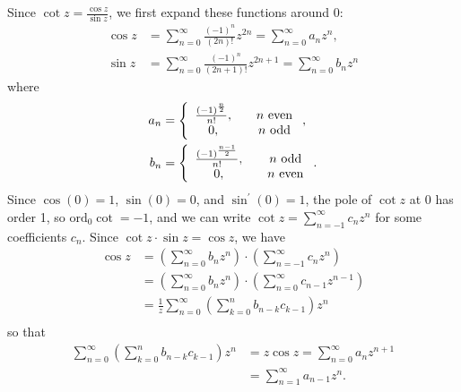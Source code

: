 \documentclass{article}
\newcommand\ord{\mathrm{ord}}
\begin{document}
\begin{Answer}
Since $\cot z = \frac{\cos z}{\sin z}$, we first expand
these functions around 0:
\begin{align*}
   \cos z
&= \sum_{n=0}^\infty
     \frac{(-1)^{n}}
          {(2n)!}
     z^{2n}
 = \sum_{n=0}^\infty
     a_n z^n, \\
   \sin z
&= \sum_{n=0}^\infty
     \frac{(-1)^{n}}
          {(2n + 1)!}
     z^{2n + 1}
 = \sum_{n=0}^\infty
     b_n z^n
\end{align*}
where
\begin{align*}
   a_n
&= \left\{
     \begin{array}{c c}
       \frac{(-1)^{\frac{n}{2}}}{n!}, & \quad n \text{ even} \\
       0,                          & \quad n \text{ odd}
     \end{array}
   \right., \\
   b_n
&= \left\{
     \begin{array}{c c}
       \frac{(-1)^\frac{n-1}{2}}{n!}, & \quad n \text{ odd} \\
       0,                            & \quad n \text{ even}
     \end{array}
   \right.. \\
\end{align*}
Since $\cos(0) = 1$, $\sin(0) = 0$, and
$\sin^\prime(0) = 1$,
the pole of $\cot z$ at 0 has order 1, so
$\ord_0 \cot = -1$, and we can write
$\cot z = \sum_{n=-1}^\infty c_n z^n$ for some
coefficients $c_n$. Since
$\cot z \cdot \sin z = \cos z$, we have
\begin{align*}
   \cos z
&= \left(
     \sum_{n=0}^\infty
       b_n
       z^n
   \right)
   \cdot
   \left(
     \sum_{n=-1}^\infty
       c_n
       z^n
   \right) \\
&= \left(
     \sum_{n=0}^\infty
       b_n
       z^n
   \right)
   \cdot
   \left(
     \sum_{n=0}^\infty
       c_{n-1}
       z^{n-1}
   \right) \\
&= \frac{1}{z}
   \sum_{n=0}^\infty
     \left(
       \sum_{k=0}^n
         b_{n-k}
         c_{k-1}
     \right)
     z^n \\
\end{align*}
so that
\begin{align*}
   \sum_{n=0}^\infty
     \left(
       \sum_{k=0}^n
         b_{n-k}
         c_{k-1}
     \right)
     z^n
&= z \cos z
 = \sum_{n=0}^\infty
     a_n z^{n+1} \\
&= \sum_{n=1}^\infty
     a_{n-1} z^n.
\end{align*}

\end{Answer}
\end{document}

